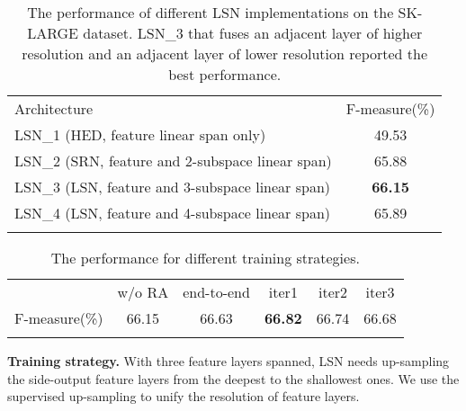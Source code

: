 \documentclass[runningheads]{llncs}
\begin{document}
\setlength{\tabcolsep}{20pt}
\begin{table}[t]
\begin{center}
\caption{The performance of different LSN implementations on the SK-LARGE dataset. LSN\_3 that fuses an adjacent layer of higher resolution and an adjacent layer of lower resolution reported the best performance. }
\begin{tabular}{lc}
\hline\noalign{\smallskip}
Architecture & F-measure(\%) \\
\noalign{\smallskip}
\hline
\noalign{\smallskip}
LSN\_1 (HED, feature linear span only)& 49.53 \\
LSN\_2 (SRN, feature and 2-subspace linear span)&65.88 \\
LSN\_3 (LSN, feature and 3-subspace linear span)&\textbf{66.15}\\
LSN\_4 (LSN, feature and 4-subspace linear span)&65.89 \\
\hline
\label{LSU_Table}
\end{tabular}
\end{center}
\end{table}
\setlength{\tabcolsep}{1.4pt}


\setlength{\tabcolsep}{8pt}
\begin{table}[h]
\begin{center}
\caption{The performance for different training strategies.}
\begin{tabular}{lccccc}
\hline\noalign{\smallskip}
   &w/o RA & end-to-end & iter1 & iter2 & iter3 \\
\noalign{\smallskip}
\hline
\noalign{\smallskip}
F-measure(\%)&66.15 & 66.63 & \textbf{66.82} & 66.74 & 66.68 \\
\hline
\label{Training_strategy_table}
\end{tabular}
\end{center}
\end{table}
\setlength{\tabcolsep}{1.4pt}

\textbf{Training strategy.}
With three feature layers spanned, LSN needs up-sampling the side-output feature layers from the deepest to the shallowest ones. We use the supervised up-sampling to unify the resolution of feature layers.
\end{document}
